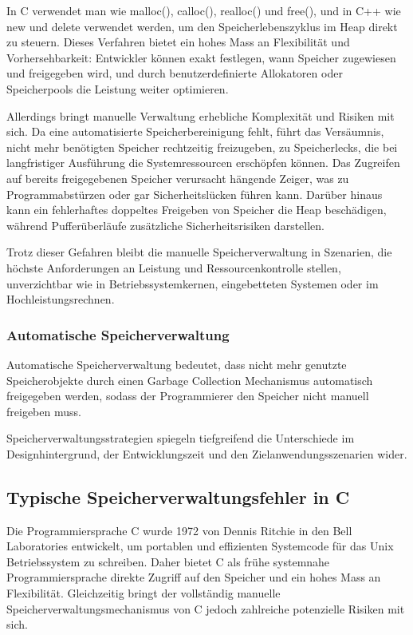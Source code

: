 In C verwendet man wie malloc(), calloc(), realloc() und free(), und 
in C++ wie new und delete verwendet werden, um den Speicherlebenszyklus 
im Heap direkt zu steuern. Dieses Verfahren bietet ein hohes Mass an 
Flexibilität und Vorhersehbarkeit: Entwickler können exakt festlegen, 
wann Speicher zugewiesen und freigegeben wird, und durch benutzerdefinierte 
Allokatoren oder Speicherpools die Leistung weiter optimieren\autocite{SmashingtheStackforFunandProfit}.

Allerdings bringt manuelle Verwaltung erhebliche Komplexität und Risiken mit 
sich. Da eine automatisierte Speicherbereinigung fehlt, führt das Versäumnis, 
nicht mehr benötigten Speicher rechtzeitig freizugeben, zu Speicherlecks, die 
bei langfristiger Ausführung die Systemressourcen erschöpfen können. Das Zugreifen 
auf bereits freigegebenen Speicher verursacht hängende Zeiger, was zu 
Programmabstürzen oder gar Sicherheitslücken führen kann\autocite{Seacord}. 
Darüber hinaus kann ein fehlerhaftes doppeltes Freigeben von Speicher die 
Heap beschädigen, während Pufferüberläufe zusätzliche Sicherheitsrisiken darstellen.

Trotz dieser Gefahren bleibt die manuelle Speicherverwaltung in Szenarien, 
die höchste Anforderungen an Leistung und Ressourcenkontrolle stellen, unverzichtbar 
wie in Betriebssystemkernen, eingebetteten Systemen oder im Hochleistungsrechnen.
\subsubsection{Automatische Speicherverwaltung}
\label{sec:Automatische Speicherverwaltung}

Automatische Speicherverwaltung bedeutet, dass nicht mehr genutzte Speicherobjekte 
durch einen Garbage Collection Mechanismus automatisch freigegeben werden, sodass 
der Programmierer den Speicher nicht manuell freigeben muss.

Speicherverwaltungsstrategien spiegeln tiefgreifend die Unterschiede im Designhintergrund, der 
Entwicklungszeit und den Zielanwendungsszenarien wider.

\subsection{Typische Speicherverwaltungsfehler in C}
\label{sec:Typische Speicherverwaltungsfehler in C}

Die Programmiersprache C wurde 1972 von Dennis Ritchie in den Bell 
Laboratories entwickelt, um portablen und effizienten Systemcode für 
das Unix Betriebssystem zu schreiben. Daher bietet C als frühe systemnahe 
Programmiersprache direkte Zugriff auf den Speicher und ein hohes Mass an Flexibilität. 
Gleichzeitig bringt der vollständig manuelle Speicherverwaltungsmechanismus von C 
jedoch zahlreiche potenzielle Risiken mit sich\autocite{TheCProgrammingLaunguage}.

